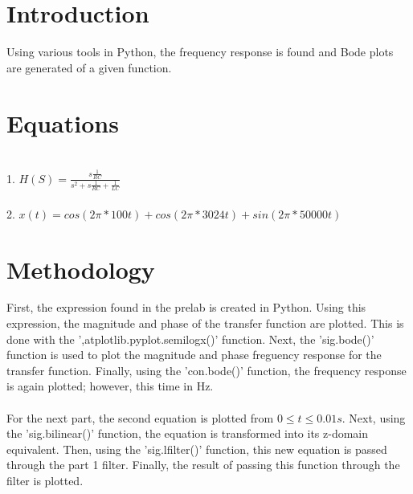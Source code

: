\documentclass[12pt]{report}
\begin{document}
\section{Introduction}
Using various tools in Python, the frequency response is found and Bode plots are generated of a given function.

\section{Equations}
\\1. $H(S)=\frac{s\frac{1}{RC}}{s^2+s\frac{1}{RC}+\frac{1}{LC}}$
\\
\\2. $x(t) = cos(2\pi * 100t) + cos(2\pi *3024t)+sin(2\pi * 50000t)$


\section{Methodology}
First, the expression found in the prelab is created in Python. Using this expression, the magnitude and phase of the transfer function are plotted. This is done with the ',atplotlib.pyplot.semilogx()' function. Next, the 'sig.bode()' function is used to plot the magnitude and phase freguency response for the transfer function. Finally, using the 'con.bode()' function, the frequency response is again plotted; however, this time in Hz.
\\
\\For the next part, the second equation is plotted from $0\leq t\leq 0.01s$. Next, using the 'sig.bilinear()' function, the equation is transformed into its z-domain equivalent. Then, using the 'sig.lfilter()' function, this new equation is passed through the part 1 filter. Finally, the result of passing this function through the filter is plotted.
\end{document}
